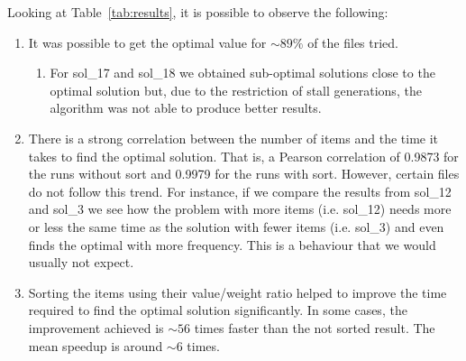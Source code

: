 \documentclass[anon]{CI}
\begin{document}
Looking at Table~\ref{tab:results}, it is possible to observe the following:
\begin{enumerate}
    \item It was possible to get the optimal value for $\sim89\%$ of the files tried.
    \begin{enumerate}
        \item For sol\_17 and sol\_18 we obtained sub-optimal solutions close to the optimal solution but, due to the restriction of stall generations, the algorithm was not able to produce better results.
    \end{enumerate}
    
    \item There is a strong correlation between the number of items and the time it takes to find the optimal solution. That is, a Pearson correlation of 0.9873 for the runs without sort and 0.9979 for the runs with sort. However, certain files do not follow this trend. For instance, if we compare the results from sol\_12 and sol\_3 we see how the problem with more items (i.e. sol\_12) needs more or less the same time as the solution with fewer items (i.e. sol\_3) and even finds the optimal with more frequency. This is a behaviour that we would usually not expect.
    
    \item Sorting the items using their value/weight ratio helped to improve the time required to find the optimal solution significantly. In some cases, the improvement achieved is $\sim56$ times faster than the not sorted result. The mean speedup is around $\sim6$ times.
\end{enumerate}
\end{document}
